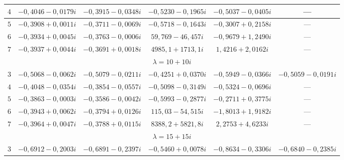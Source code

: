\begin{table}[h!]
\begin{tabular}{c|c|c|c|c|c}
      \hline

      $4$&$-0{,}4046-0{,}0179i$&$-0{,}3915-0{,}0348i$&$-0{,}5230-0{,}1965i$&$-0{,}5037-0{,}0405i$&---\\

      \hline

      $5$&$-0{,}3908+0{,}0011i$&$-0{,}3711-0{,}0069i$&$-0{,}5718-0{,}1643i$&$-0{,}3007+0{,}2158i$&---\\

      \hline

      $6$&$-0{,}3934+0{,}0045i$&$-0{,}3763-0{,}0006i$&$59{,}769-46{,}457i$&$-0{,}9679+1{,}2490i$&---\\

      \hline

      $7$&$-0{,}3937+0{,}0044i$&$-0{,}3691+0{,}0018i$&$4985{,}1+1713{,}1i$&$1{,}4216+2{,}0162i$&---\\

      \hline

      \multicolumn{6}{c}{$\lambda=10+10i$}\\

      \hline

      $3$&$-0{,}5068-0{,}0062i$&$-0{,}5079-0{,}0211i$&$-0{,}4251+0{,}0370i$&$-0{,}5949-0{,}0366i$&$-0{,}5059-0{,}0191i$\\

      \hline

      $4$&$-0{,}4048-0{,}0354i$&$-0{,}3854-0{,}0557i$&$-0{,}5098-0{,}3149i$&$-0{,}5324-0{,}0696i$&---\\

      \hline

      $5$&$-0{,}3863-0{,}0003i$&$-0{,}3586-0{,}0042i$&$-0{,}5993-0{,}2877i$&$-0{,}2711+0{,}3775i$&---\\

      \hline

      $6$&$-0{,}3943+0{,}0062i$&$-0{,}3794+0{,}0126i$&$115{,}03-54{,}515i$&$-1{,}8013+1{,}9182i$&---\\

      \hline

      $7$&$-0{,}3964+0{,}0047i$&$-0{,}3788+0{,}0115i$&$8388{,}2+5821{,}8i$&$2{,}2753+4{,}6233i$&---\\

      \hline

      \multicolumn{6}{c}{$\lambda=15+15i$}\\

      \hline

      $3$&$-0{,}6912-0{,}2003i$&$-0{,}6891-0{,}2397i$&$-0{,}5460+0{,}0078i$&$-0{,}8634-0{,}3306i$&$-0{,}6840-0{,}2385i$\\


\end{tabular}
\end{table}
